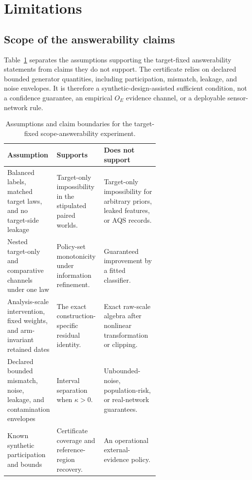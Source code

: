 \section{Limitations}
\suppressfloats[t]
\label{sec:limitations}

\subsection{Scope of the answerability claims}

Table~\ref{tab:v05-theory-assumptions} separates the assumptions supporting
the target-fixed answerability statements from claims they do not support. The
certificate relies on declared bounded generator quantities, including
participation, mismatch, leakage, and noise envelopes. It is therefore a
synthetic-design-assisted sufficient condition, not a confidence guarantee, an
empirical $O_E$ evidence channel, or a deployable sensor-network rule.

\begin{table}[tbp]
\centering
\caption{Assumptions and claim boundaries for the target-fixed
scope-answerability experiment.}
\label{tab:v05-theory-assumptions}
\small
\begin{tabularx}{\linewidth}{@{}p{0.31\linewidth}p{0.31\linewidth}X@{}}
\toprule
Assumption & Supports & Does not support \\
\midrule
Balanced labels, matched target laws, and no target-side leakage &
Target-only impossibility in the stipulated paired worlds. &
Target-only impossibility for arbitrary priors, leaked features, or AQS
records. \\
\addlinespace
Nested target-only and comparative channels under one law &
Policy-set monotonicity under information refinement. &
Guaranteed improvement by a fitted classifier. \\
\addlinespace
Analysis-scale intervention, fixed weights, and arm-invariant retained dates &
The exact construction-specific residual identity. &
Exact raw-scale algebra after nonlinear transformation or clipping. \\
\addlinespace
Declared bounded mismatch, noise, leakage, and contamination envelopes &
Interval separation when $\kappa>0$. &
Unbounded-noise, population-risk, or real-network guarantees. \\
\addlinespace
Known synthetic participation and bounds &
Certificate coverage and reference-region recovery. &
An operational external-evidence policy. \\
\bottomrule
\end{tabularx}
\end{table}

